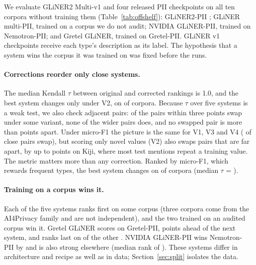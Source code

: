 \documentclass[11pt]{article}
\begin{document}
We evaluate GLiNER2 Multi-v1 and four released PII checkpoints on all
ten corpora without training them (Table~\ref{tab:offshelf}):
GLiNER2-PII \cite{zaratiana2026gliner2pii}; GLiNER multi-PII, trained
on a corpus we do not audit; NVIDIA GLiNER-PII, trained on
Nemotron-PII; and Gretel GLiNER, trained on Gretel-PII. GLiNER v1
checkpoints receive each type's description as its label. The
hypothesis that a system wins the corpus it was trained on was fixed
before the runs.

\paragraph{Corrections reorder only close systems.}
The median Kendall $\tau$ between original and corrected rankings is
1.0, and the best system changes only under V2, on 
of  corpora. Because $\tau$ over five systems is a weak
test, we also check adjacent pairs:  of the 
pairs within three points swap under some variant, none of the
 wider pairs does, and no swapped pair is more than
 points apart. Under micro-F1 the picture is the same for
V1, V3 and V4 ( of  close pairs swap), but
scoring only novel values (V2) also swaps  pairs that are
far apart, by up to  points on Kiji, where most test
mentions repeat a training value. The metric matters more than any
correction.
Ranked by micro-F1, which rewards frequent types, the best system
changes on  of  corpora (median $\tau$ =
).

\paragraph{Training on a corpus wins it.}
Each of the five systems ranks first on some corpus (three corpora come
from the AI4Privacy family and are not independent), and the two
trained on an audited corpus win it. Gretel GLiNER scores
 on Gretel-PII,  points ahead of the
next system, and ranks last on  of the other
. NVIDIA GLiNER-PII wins Nemotron-PII by
 and is also strong elsewhere (median rank
 of ). These systems differ in
architecture and recipe as well as in data; Section~\ref{sec:split}
isolates the data.

\end{document}
